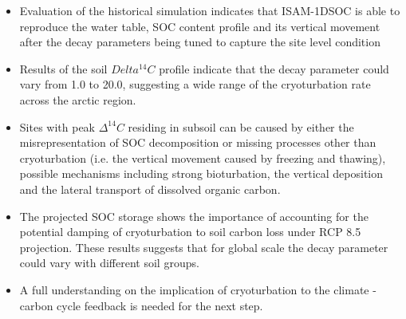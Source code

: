 \documentclass[portait,custom]{sciposter}
\begin{document}
\begin{multicols*}{4}
\begin{itemize}
 \item Evaluation of the historical simulation indicates that ISAM-1DSOC is able to reproduce the water table, SOC content profile and its vertical movement after the decay parameters being tuned to capture the site level condition
 \item Results of the soil $Delta ^{14}C$ profile indicate that the decay parameter could vary from 1.0 to 20.0, suggesting a wide range of the cryoturbation rate across the arctic region.
 \item Sites with peak $\Delta ^{14}C$ residing in subsoil can be caused by either the misrepresentation of SOC decomposition or missing processes other than cryoturbation (i.e. the vertical movement caused by freezing and thawing), possible mechanisms including strong bioturbation, the vertical deposition and the lateral transport of dissolved organic carbon.
 \item The projected SOC storage shows the importance of accounting for the potential damping of cryoturbation to soil carbon loss under RCP 8.5 projection. These results suggests that for global scale the decay parameter could vary with different soil groups.
 \item A full understanding on the implication of cryoturbation to the climate - carbon cycle feedback is needed for the next step.
\end{itemize}

%


% 
% 


\end{multicols*}
\end{document}
